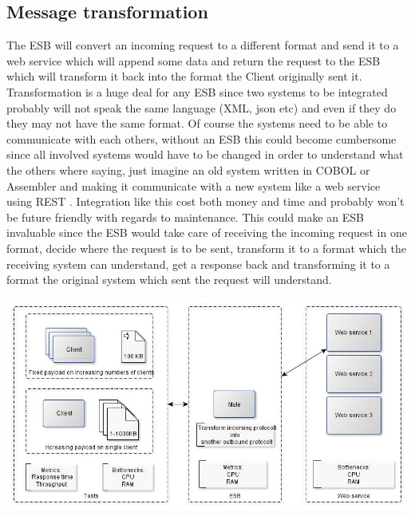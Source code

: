 \subsection{Message transformation}
The ESB will convert an incoming request to a different format and send it to a web service which will append some data and return the request to the ESB which will transform it back into the format the Client originally sent it.
Transformation is a huge deal for any ESB since two systems to be integrated probably will not speak the same language (XML, json etc) and even if they do they may not have the same format. Of course the systems need to be able to communicate with each others, without an ESB this could become cumbersome since all involved systems would have to be changed in order to understand what the others where saying, just imagine an old system written in COBOL or Assembler and making it communicate with a new system like a web service using REST \cite{whatisrest}. Integration like this cost both money and time and probably won't be future friendly with regards to maintenance.
This could make an ESB invaluable since the ESB would take care of receiving the incoming request in one format, decide where the request is to be sent, transform it to a format which the receiving system can understand, get a response back and transforming it to a format the original system which sent the request will understand.

\centerline{\includegraphics[scale=0.43]{img/transformation}}
